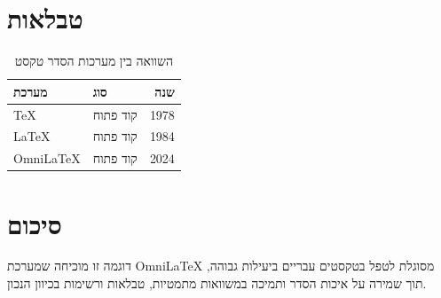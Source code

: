 \documentclass[doctype=article,language=hebrew]{../../omnilatex}
\begin{document}
\section{טבלאות}

\begin{table}[htbp]
  \caption{השוואה בין מערכות הסדר טקסט}
  \begin{tabular}{llr}
    \textbf{מערכת} & \textbf{סוג} & \textbf{שנה} \\
    \hline
    TeX  & קוד פתוח & 1978 \\
    LaTeX & קוד פתוח & 1984 \\
    OmniLaTeX & קוד פתוח & 2024 \\
  \end{tabular}
\end{table}

\section{סיכום}

דוגמה זו מוכיחה שמערכת OmniLaTeX מסוגלת לטפל בטקסטים עבריים
ביעילות גבוהה, תוך שמירה על איכות הסדר ותמיכה במשוואות מתמטיות,
טבלאות ורשימות בכיוון הנכון.
\end{document}
